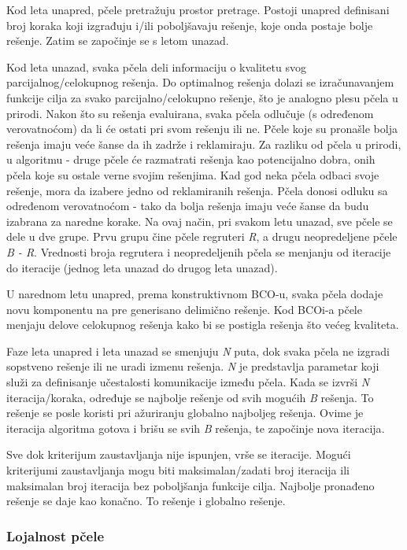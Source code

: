 \documentclass[a4paper]{article}
\begin{document}
{Kod leta unapred, pčele pretražuju prostor pretrage. Postoji unapred definisani broj koraka koji izgrađuju i/ili poboljšavaju rešenje, koje onda postaje bolje rešenje. Zatim se započinje se s letom unazad.

Kod leta unazad, svaka pčela deli informaciju o kvalitetu svog parcijalnog/celokupnog rešenja. Do optimalnog rešenja dolazi se izračunavanjem funkcije cilja za svako parcijalno/celokupno rešenje, što je analogno plesu pčela u prirodi. Nakon što su rešenja evaluirana, svaka pčela odlučuje (s određenom verovatnoćom) da li će ostati pri svom rešenju ili ne. Pčele koje su pronašle bolja rešenja imaju veće šanse da ih zadrže i reklamiraju. Za razliku od pčela u prirodi, u algoritmu - druge pčele će razmatrati rešenja kao potencijalno dobra, onih pčela koje su ostale verne svojim rešenjima. Kad god neka pčela odbaci svoje rešenje, mora da izabere jedno od reklamiranih rešenja. Pčela donosi odluku sa određenom verovatnoćom - tako da bolja rešenja imaju veće šanse da budu izabrana za naredne korake. Na ovaj način, pri svakom letu unazad, sve pčele se dele u dve grupe. Prvu grupu čine pčele regruteri {\em R}, a drugu neopredeljene pčele {\em B - R}. Vrednosti broja regrutera i neopredeljenih pčela se menjanju od iteracije do iteracije (jednog leta unazad do drugog leta unazad). 

U narednom letu unapred, prema konstruktivnom BCO-u, svaka pčela dodaje novu komponentu na pre generisano delimično rešenje. Kod BCOi-a pčele menjaju delove celokupnog rešenja kako bi se postigla rešenja što većeg kvaliteta.

Faze leta unapred i leta unazad se smenjuju {\em N} puta, dok svaka pčela ne izgradi sopstveno rešenje ili ne uradi izmenu rešenja. {\em N} je predstavlja parametar koji služi za definisanje učestalosti komunikacije između pčela. Kada se izvrši {\em N} iteracija/koraka, određuje se najbolje rešenje od svih mogućih {\em B} rešenja. To rešenje se posle koristi pri ažuriranju globalno najboljeg rešenja. Ovime je iteracija algoritma gotova i brišu se svih {\em B} rešenja, te započinje nova iteracija\cite{bcoalg}.

Sve dok kriterijum zaustavljanja nije ispunjen, vrše se iteracije. Mogući kriterijumi zaustavljanja mogu biti maksimalan/zadati broj iteracija ili maksimalan broj iteracija bez poboljšanja funkcije cilja.
Najbolje pronađeno rešenje se daje kao konačno. To rešenje i globalno rešenje.

\subsubsection{Lojalnost pčele}
\label{subsubsec:lojalnost}

}
\end{document}
